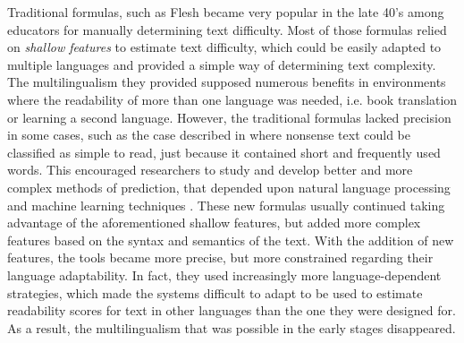 \documentclass[12pt]{article}
\begin{document}
Traditional formulas, such as Flesh \cite{flesch1948new} became very popular in the late 40's among educators for manually determining text difficulty. Most of those formulas relied on \textit{shallow features} to estimate text difficulty, which could be easily adapted to multiple languages and provided a simple way of determining text complexity. The multilingualism they provided supposed numerous benefits in environments where the readability of more than one language was needed, i.e. book translation or learning a second language. However, the traditional formulas lacked precision in some cases, such as the case described in \cite{davison1982failure} where nonsense text could be classified as simple to read, just because it contained short and frequently used words. This encouraged researchers to study and develop better and more complex methods of prediction, that depended upon natural language processing and machine learning techniques \cite{franccois2012ai,aluisio2010readability}. These new formulas usually continued taking advantage of the aforementioned shallow  features, but added more complex features based on the syntax and semantics of the text. With the addition of new features, the tools became more precise, but more constrained regarding their language adaptability. In fact, they used increasingly more language-dependent strategies, which made the systems difficult to adapt to be used to estimate readability scores for text in other languages than the one they were designed for. As a result, the multilingualism that was possible in the early stages disappeared.  
\end{document}
